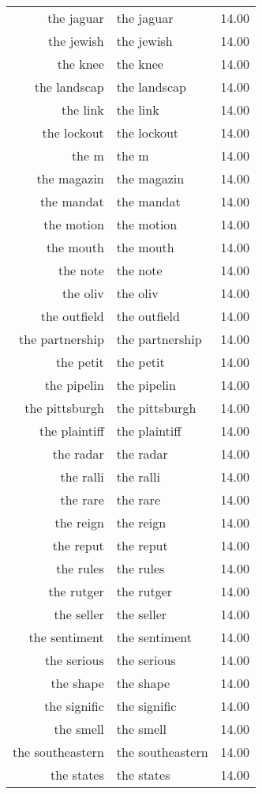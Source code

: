 \begin{table}[ht]
\begin{tabular}{rlr}
  the jaguar & the jaguar & 14.00 \\ 
  the jewish & the jewish & 14.00 \\ 
  the knee & the knee & 14.00 \\ 
  the landscap & the landscap & 14.00 \\ 
  the link & the link & 14.00 \\ 
  the lockout & the lockout & 14.00 \\ 
  the m & the m & 14.00 \\ 
  the magazin & the magazin & 14.00 \\ 
  the mandat & the mandat & 14.00 \\ 
  the motion & the motion & 14.00 \\ 
  the mouth & the mouth & 14.00 \\ 
  the note & the note & 14.00 \\ 
  the oliv & the oliv & 14.00 \\ 
  the outfield & the outfield & 14.00 \\ 
  the partnership & the partnership & 14.00 \\ 
  the petit & the petit & 14.00 \\ 
  the pipelin & the pipelin & 14.00 \\ 
  the pittsburgh & the pittsburgh & 14.00 \\ 
  the plaintiff & the plaintiff & 14.00 \\ 
  the radar & the radar & 14.00 \\ 
  the ralli & the ralli & 14.00 \\ 
  the rare & the rare & 14.00 \\ 
  the reign & the reign & 14.00 \\ 
  the reput & the reput & 14.00 \\ 
  the rules & the rules & 14.00 \\ 
  the rutger & the rutger & 14.00 \\ 
  the seller & the seller & 14.00 \\ 
  the sentiment & the sentiment & 14.00 \\ 
  the serious & the serious & 14.00 \\ 
  the shape & the shape & 14.00 \\ 
  the signific & the signific & 14.00 \\ 
  the smell & the smell & 14.00 \\ 
  the southeastern & the southeastern & 14.00 \\ 
  the states & the states & 14.00 \\ 

\end{tabular}
\end{table}
